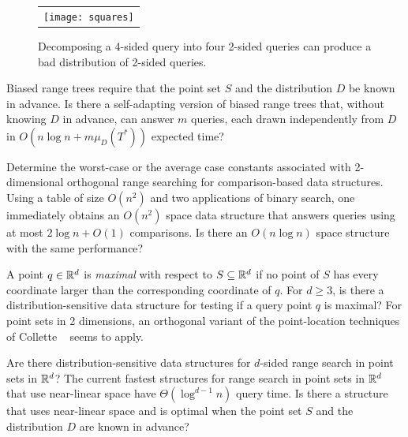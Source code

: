\documentclass{patmorin}
\begin{document}
\begin{figure}
  \begin{center}
    \begin{tabular}{c}
      \texttt{[image: squares]}
    \end{tabular}
  \end{center}
  \caption{Decomposing a 4-sided query into four 2-sided queries can
           produce a bad distribution of 2-sided queries.}
\end{figure}



\begin{op}
Biased range trees require that the point set $S$ and the
distribution $D$ be known in advance.  Is
there a self-adapting version of biased range trees that, without
knowing $D$ in advance, can answer $m$ queries, each drawn
independently from $D$ in $O(n\log n+ m\mu_D(T^*))$ expected time?
\end{op}

\begin{op}
Determine the worst-case or the average case constants associated with
2-dimensional orthogonal range searching for comparison-based data
structures.  Using a table of size $O(n^2)$ and two applications of binary
search, one immediately obtains an $O(n^2)$ space data structure that
answers queries using at most $2\log n + O(1)$ comparisons.  Is there an
$O(n\log n)$ space structure with the same performance?
\end{op}

\begin{op}
A point $q\in \mathbb{R}^d$ is \emph{maximal} with respect to $S\subseteq\mathbb{R}^d$
if no point of $S$ has every coordinate larger than the corresponding
coordinate of $q$. For $d\ge 3$,  is there a distribution-sensitive 
data structure for
testing if a query point $q$ is maximal?  For point sets in 2
dimensions, an orthogonal variant of the point-location techniques of Collette
\etal\ \cite{cdilm08} seems to apply. 
\end{op}


\begin{op}
Are there distribution-sensitive data structures for $d$-sided range
search in point sets in $\mathbb{R}^d$?  The current fastest structures
for range search in point sets in $\mathbb{R}^d$ that use near-linear space have
$\Theta(\log^{d-1} n)$ query time.  Is there a structure that uses
near-linear space and is optimal
when the point set $S$ and the distribution $D$ are known in advance?
\end{op}



\end{document}
